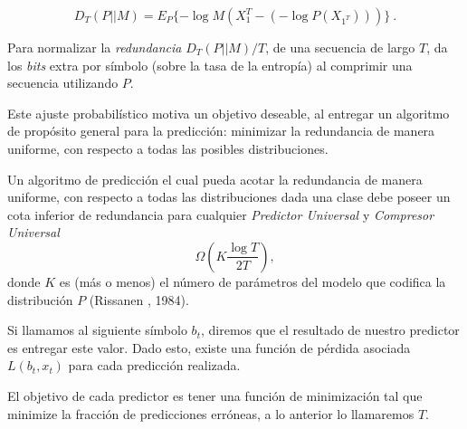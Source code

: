 \begin{equation}
D_{T} ( P || M ) = E_{P} \{ - \log M(X_{1}^{T} - (- \log P(X_{1^{T}})   )  )       \} \ .
\end{equation}
 

Para normalizar la \emph{redundancia} $D_{T} ( P || M ) / T $, de una secuencia de largo $T$, da los  \emph{bits} extra por símbolo (sobre la tasa de la entropía) al comprimir una secuencia utilizando $P$.  

Este ajuste probabilístico motiva un objetivo deseable, al entregar un algoritmo de propósito general para la predicción: minimizar la redundancia de manera uniforme, con respecto a todas las posibles distribuciones. 

Un algoritmo de predicción el cual pueda acotar la redundancia de manera uniforme, con respecto a todas las distribuciones dada una clase debe poseer un cota inferior de redundancia para cualquier \emph{Predictor Universal} y \emph{Compresor Universal} \begin{equation}
\Omega \left(  K \dfrac{\log T}{2 T } \right),
\end{equation} donde $K$ es (más o menos) el número de parámetros del modelo que codifica la distribución $P$ (Rissanen \cite{Rissanen1984}, 1984).






 

Si llamamos al siguiente símbolo $b_{t}$, diremos que el resultado de nuestro predictor es entregar este valor. Dado esto, existe una función de pérdida asociada $L( b_{t},x_{t} )$ para cada predicción realizada. 

El objetivo de cada predictor es tener una función de minimización tal que minimize la fracción de predicciones erróneas, a lo anterior lo llamaremos $T$.%




